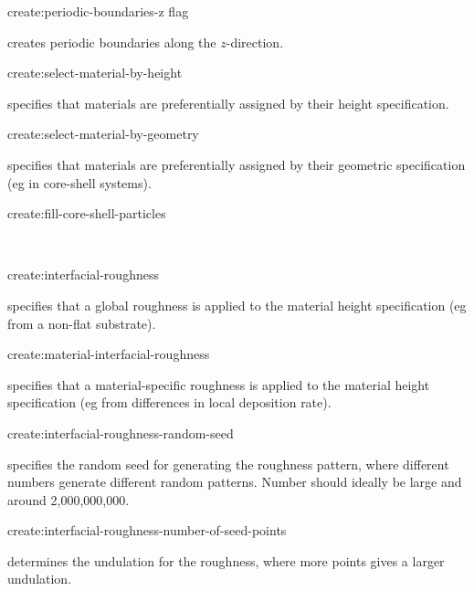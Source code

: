 {\zicf create:periodic-boundaries-z flag} creates periodic boundaries along the $z$-direction.\\ \par

{\zicf create:select-material-by-height} specifies that materials are preferentially assigned by their height specification.\\ \par

{\zicf create:select-material-by-geometry} specifies that materials are preferentially assigned by their geometric specification (eg in core-shell systems).\\ \par

{\zicf create:fill-core-shell-particles}\\ \par

{\zicf create:interfacial-roughness} specifies that a global roughness is applied to the material height specification (eg from a non-flat substrate).\\ \par

{\zicf create:material-interfacial-roughness} specifies that a material-specific roughness is applied to the material height specification (eg from differences in local deposition rate).\\ \par

{\zicf create:interfacial-roughness-random-seed} specifies the random seed for generating the roughness pattern, where different numbers generate different random patterns. Number should ideally be large and around 2,000,000,000.\\ \par

{\zicf create:interfacial-roughness-number-of-seed-points} determines the undulation for the roughness, where more points gives a larger undulation.\\ \par

